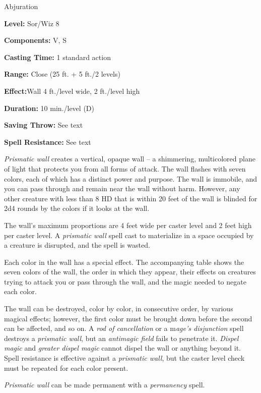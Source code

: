 
Abjuration

\textbf{Level:} Sor/Wiz 8

\textbf{Components:} V, S

\textbf{Casting Time:} 1 standard action

\textbf{Range:} Close (25 ft. + 5 ft./2 levels)

\textbf{Effect:}Wall 4 ft./level wide, 2 ft./level high

\textbf{Duration:} 10 min./level (D)

\textbf{Saving Throw:} See text

\textbf{Spell Resistance:} See text

\textit{Prismatic wall} creates a vertical, opaque wall -- a shimmering, multicolored 
plane of light that protects you from all forms of attack. The wall flashes with 
seven colors, each of which has a distinct power and purpose. The wall is immobile, 
and you can pass through and remain near the wall without harm. However, any other 
creature with less than 8 HD that is within 20 feet of the wall is blinded for 
2d4 rounds by the colors if it looks at the wall.

The wall's maximum proportions are 4 feet wide per caster level and 2 feet high 
per caster level. A \textit{prismatic wall} spell cast to materialize in a space 
occupied by a creature is disrupted, and the spell is wasted.

Each color in the wall has a special effect. The accompanying table shows the seven 
colors of the wall, the order in which they appear, their effects on creatures 
trying to attack you or pass through the wall, and the magic needed to negate each 
color.

The wall can be destroyed, color by color, in consecutive order, by various magical 
effects; however, the first color must be brought down before the second can be 
affected, and so on. A \textit{rod of cancellation} or a m\textit{age's disjunction 
}spell destroys a \textit{prismatic wall}, but an \textit{antimagic field} fails 
to penetrate it. \textit{Dispel magic} and \textit{greater dispel magic} cannot 
dispel the wall or anything beyond it. Spell resistance is effective against a 
\textit{prismatic wall}, but the caster level check must be repeated for each color 
present.

\textit{Prismatic wall} can be made permanent with a \textit{permanency} spell.

